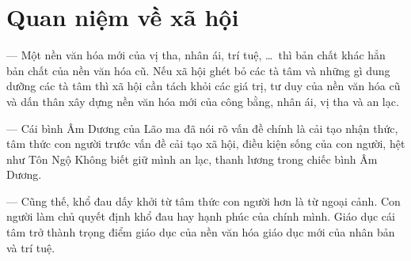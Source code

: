 \section{Quan niệm về xã hội} %
\label{sec:74_75_xa_hoi}

--- Một nền văn hóa mới của vị tha, nhân ái, trí tuệ, \ldots ~thì bản chất khác hẳn bản chất của nền văn hóa cũ. Nếu xã hội ghét bỏ các tà tâm và những gì dung dưỡng các tà tâm thì xã hội cần tách khỏi các giá trị, tư duy của nền văn hóa cũ và dấn thân xây dựng nền văn hóa mới của công bằng, nhân ái, vị tha và an lạc.

--- Cái bình Âm Dương của Lão ma đã nói rõ vấn đề chính là cải tạo nhận thức, tâm thức con người trước vấn đề cải tạo xã hội, điều kiện sống của con người, hệt như Tôn Ngộ Không biết giữ mình an lạc, thanh lương trong chiếc bình Âm Dương.

--- Cũng thế, khổ đau dấy khởi từ tâm thức con người hơn là từ ngoại cảnh. Con người làm chủ quyết định khổ đau hay hạnh phúc của chính mình. Giáo dục cái tâm trở thành trọng điểm giáo dục của nền văn hóa giáo dục mới của nhân bản và trí tuệ.
